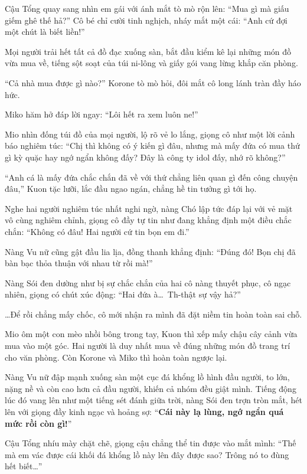 \documentclass[../main.tex]{subfiles}
\begin{document}
Cậu Tổng quay sang nhìn em gái với ánh mắt tò mò rộn lên: ``Mua gì mà giấu giếm ghê thế hả?'' Cô bé chỉ cười tinh nghịch, nháy mắt một cái: ``Anh cứ đợi một chút là biết liền!''

Mọi người trải hết tất cả đồ đạc xuống sàn, bắt đầu kiểm kê lại những món đồ vừa mua về, tiếng sột soạt của túi ni-lông và giấy gói vang lừng khắp căn phòng.

``Cả nhà mua được gì nào?'' Korone tò mò hỏi, đôi mắt cô long lánh tràn đầy háo hức.

Miko hăm hở đáp lời ngay: ``Lôi hết ra xem luôn ne!''

Mio nhìn đống túi đồ của mọi người, lộ rõ vẻ lo lắng, giọng cô như một lời cảnh báo nghiêm túc: ``Chị thì không có ý kiến gì đâu, nhưng mà mấy đứa có mua thứ gì kỳ quặc hay ngớ ngẩn không đấy? Đây là công ty idol đấy, nhớ rõ không?''

``Anh cá là mấy đứa chắc chắn đã về với thứ chẳng liên quan gì đến công chuyện đâu,'' Kuon tặc lưỡi, lắc đầu ngao ngán, chẳng hề tin tưởng gì tới họ.

Nghe hai người nghiêm túc nhất nghi ngờ, nàng Chó lập tức đáp lại với vẻ mặt vô cùng nghiêm chỉnh, giọng cô đầy tự tin như đang khẳng định một điều chắc chắn: ``Không có đâu! Hai người cứ tin bọn em đi.''

Nàng Vu nữ cũng gật đầu lia lịa, đồng thanh khẳng định: ``Đúng đó! Bọn chị đã bàn bạc thỏa thuận với nhau từ rồi mà!''

Nàng Sói đen dường như bị sự chắc chắn của hai cô nàng thuyết phục, cô ngạc nhiên, giọng có chút xúc động: ``Hai đứa à\dots\ Th-thật sự vậy hả?''

\dots Để rồi chẳng mấy chốc, cô mới nhận ra mình đã đặt niềm tin hoàn toàn sai chỗ.

Mio ôm một con mèo nhồi bông trong tay, Kuon thì xếp mấy chậu cây cảnh vừa mua vào một góc. Hai người là duy nhất mua về đúng những món đồ trang trí cho văn phòng. Còn Korone và Miko thì hoàn toàn ngược lại.


Nàng Vu nữ đập mạnh xuống sàn một cục đá khổng lồ hình đầu người, to lớn, nặng nề và còn cao hơn cả đầu người, khiến cả nhóm đều giật mình. Tiếng động lúc đó vang lên như một tiếng sét đánh giữa trời,  nàng Sói đen trợn tròn mắt, hét lên với giọng đầy kinh ngạc và hoảng sợ: ``\textbf{Cái này lạ lùng, ngớ ngẩn quá mức rồi còn gì!}''

Cậu Tổng nhíu mày chặt chẽ, giọng cậu chẳng thể tin được vào mắt mình: ``Thế mà em vác được cái khối đá khổng lồ này lên đây được sao? Trông nó to đùng hết biết\dots''
\end{document}
